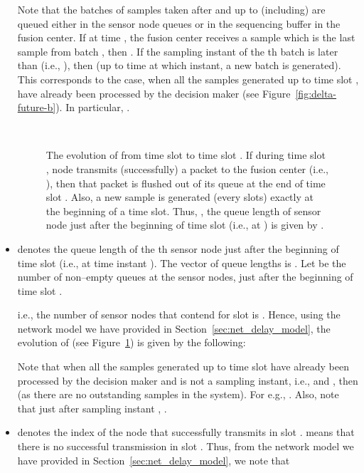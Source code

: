 \documentclass[acmtosn]{acmtrans2m}
\begin{document}
\begin{itemize}
      Note that the batches of samples taken after  and up to 
      (including)  are queued either in the sensor node queues or 
      in the sequencing buffer in the fusion center. If at time , 
      the fusion center receives a sample which 
      is the last sample from batch , then .
      If the sampling instant of the th batch is later than  
      (i.e., ), then  (up to time 
       at which instant, a new batch is generated). This corresponds 
      to the case, when all the samples generated up to time slot , 
      have already been processed by the decision maker 
      (see Figure~\ref{fig:delta-future-b}). In particular, 
      .

\begin{figure}[t]
   \centering \
   \caption{The evolution of  from time slot  to time slot . 
      If during time slot , node  transmits (successfully) a packet to the 
      fusion center (i.e., ), then that packet is flushed out of its 
      queue at the end of time slot . Also, a new sample is generated 
      (every  slots) exactly at the beginning of a time slot. Thus,
      , the queue length of sensor node  just after the 
      beginning of time slot  (i.e., at ) is given by 
      .} 
   \label{fig:na_processing_embedding_sensor_side}
\end{figure}

\item[]  denotes the queue 
     length of the th sensor node just after the beginning of time 
     slot  (i.e., at time instant ). The vector of queue lengths is 
     .
     Let  be the number of non--empty
     queues at the sensor nodes, just after the beginning of time slot .
      
     i.e., the number of sensor nodes that contend for slot  is .
     Hence, using the network model we have provided in Section~\ref{sec:net_delay_model},
     the evolution of  (see Figure~\ref{fig:na_processing_embedding_sensor_side})
     is given by the following: 
\setlength{\extrarowheight}{0.3cm}
     

\setlength{\extrarowheight}{-0.3cm}
     Note that when all the samples generated up to time slot  have already been processed by the 
     decision maker and  is not a sampling instant, i.e.,  and 
     , then  (as there are no outstanding 
     samples in the system). For e.g., . Also, note that just after sampling instant , .


\item[]  denotes the index of the node
     that successfully transmits in slot .  means that there
     is no successful transmission in slot . Thus,
     from the network model we have provided in Section~\ref{sec:net_delay_model},
     we note that
     

\end{itemize}
\end{document}
